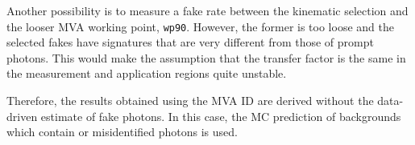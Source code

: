 Another possibility is to measure a fake rate between the kinematic selection and the looser MVA working point, \texttt{wp90}.
However, the former is too loose and the selected fakes have signatures that are very different from those of prompt photons.
This would make the assumption that the transfer factor is the same in the measurement and application regions quite unstable.


Therefore, the results obtained using the MVA ID are derived without the data-driven estimate of fake photons.
In this case, the MC prediction of backgrounds which contain \nonprompt or misidentified photons is used.
